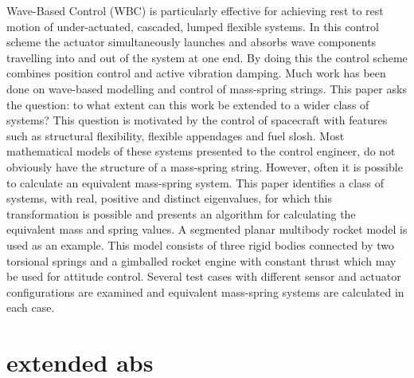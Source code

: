 \documentclass{mbd_fullpaper}
\begin{document}
Wave-Based Control (WBC) is particularly effective for achieving rest to rest motion of under-actuated, cascaded, lumped flexible systems.
In this control scheme the actuator simultaneously launches and absorbs wave components travelling into and out of the system at one end.
By doing this the control scheme combines position control and active vibration damping.
Much work has been done on wave-based modelling and control of mass-spring strings.
This paper asks the question: to what extent can this work be extended to a wider class of systems?
This question is motivated by the control of spacecraft with features such as structural flexibility, flexible appendages and fuel slosh.
Most mathematical models of these systems presented to the control engineer, do not obviously have the structure of a mass-spring string.
However, often it is possible to calculate an equivalent mass-spring system.
This paper identifies a class of systems, with real, positive and distinct eigenvalues, for which this transformation is possible and presents an algorithm for calculating the equivalent mass and spring values.
A segmented planar multibody rocket model is used as an example.
This model consists of three rigid bodies connected by two torsional springs and a gimballed rocket engine with constant thrust which may be used for attitude control.
Several test cases with different sensor and actuator configurations are examined and equivalent mass-spring systems are calculated in each case.

\section{extended abs}
\end{document}
